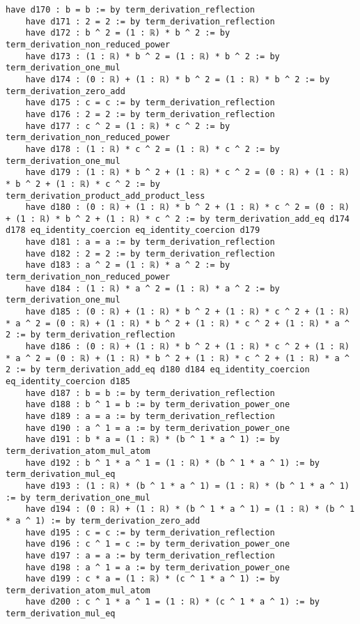 \documentclass{article}
\begin{document}
\begin{tcolorbox}[colback=white!10, width=\linewidth]
\begin{lstlisting}[language=Lean4]
    have d170 : b = b := by term_derivation_reflection
    have d171 : 2 = 2 := by term_derivation_reflection
    have d172 : b ^ 2 = (1 : ℝ) * b ^ 2 := by term_derivation_non_reduced_power
    have d173 : (1 : ℝ) * b ^ 2 = (1 : ℝ) * b ^ 2 := by term_derivation_one_mul
    have d174 : (0 : ℝ) + (1 : ℝ) * b ^ 2 = (1 : ℝ) * b ^ 2 := by term_derivation_zero_add
    have d175 : c = c := by term_derivation_reflection
    have d176 : 2 = 2 := by term_derivation_reflection
    have d177 : c ^ 2 = (1 : ℝ) * c ^ 2 := by term_derivation_non_reduced_power
    have d178 : (1 : ℝ) * c ^ 2 = (1 : ℝ) * c ^ 2 := by term_derivation_one_mul
    have d179 : (1 : ℝ) * b ^ 2 + (1 : ℝ) * c ^ 2 = (0 : ℝ) + (1 : ℝ) * b ^ 2 + (1 : ℝ) * c ^ 2 := by term_derivation_product_add_product_less
    have d180 : (0 : ℝ) + (1 : ℝ) * b ^ 2 + (1 : ℝ) * c ^ 2 = (0 : ℝ) + (1 : ℝ) * b ^ 2 + (1 : ℝ) * c ^ 2 := by term_derivation_add_eq d174 d178 eq_identity_coercion eq_identity_coercion d179
    have d181 : a = a := by term_derivation_reflection
    have d182 : 2 = 2 := by term_derivation_reflection
    have d183 : a ^ 2 = (1 : ℝ) * a ^ 2 := by term_derivation_non_reduced_power
    have d184 : (1 : ℝ) * a ^ 2 = (1 : ℝ) * a ^ 2 := by term_derivation_one_mul
    have d185 : (0 : ℝ) + (1 : ℝ) * b ^ 2 + (1 : ℝ) * c ^ 2 + (1 : ℝ) * a ^ 2 = (0 : ℝ) + (1 : ℝ) * b ^ 2 + (1 : ℝ) * c ^ 2 + (1 : ℝ) * a ^ 2 := by term_derivation_reflection
    have d186 : (0 : ℝ) + (1 : ℝ) * b ^ 2 + (1 : ℝ) * c ^ 2 + (1 : ℝ) * a ^ 2 = (0 : ℝ) + (1 : ℝ) * b ^ 2 + (1 : ℝ) * c ^ 2 + (1 : ℝ) * a ^ 2 := by term_derivation_add_eq d180 d184 eq_identity_coercion eq_identity_coercion d185
    have d187 : b = b := by term_derivation_reflection
    have d188 : b ^ 1 = b := by term_derivation_power_one
    have d189 : a = a := by term_derivation_reflection
    have d190 : a ^ 1 = a := by term_derivation_power_one
    have d191 : b * a = (1 : ℝ) * (b ^ 1 * a ^ 1) := by term_derivation_atom_mul_atom
    have d192 : b ^ 1 * a ^ 1 = (1 : ℝ) * (b ^ 1 * a ^ 1) := by term_derivation_mul_eq
    have d193 : (1 : ℝ) * (b ^ 1 * a ^ 1) = (1 : ℝ) * (b ^ 1 * a ^ 1) := by term_derivation_one_mul
    have d194 : (0 : ℝ) + (1 : ℝ) * (b ^ 1 * a ^ 1) = (1 : ℝ) * (b ^ 1 * a ^ 1) := by term_derivation_zero_add
    have d195 : c = c := by term_derivation_reflection
    have d196 : c ^ 1 = c := by term_derivation_power_one
    have d197 : a = a := by term_derivation_reflection
    have d198 : a ^ 1 = a := by term_derivation_power_one
    have d199 : c * a = (1 : ℝ) * (c ^ 1 * a ^ 1) := by term_derivation_atom_mul_atom
    have d200 : c ^ 1 * a ^ 1 = (1 : ℝ) * (c ^ 1 * a ^ 1) := by term_derivation_mul_eq

\end{lstlisting}
\end{tcolorbox}
\end{document}

